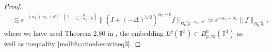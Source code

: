 \documentclass[12pt,a4paper]{article}
\theoremstyle{definition}
\theoremstyle{remark}
\numberwithin{equation}{section}
\begin{document}
\begin{appendices}
\begin{proof}
\begin{align*}
&\lesssim \epsilon^{-(\alpha_1+\alpha_3+\theta) \cdot \left( 1 - \frac{\theta}{\alpha_1+\alpha_3+\theta} \right)} \lVert (I + (- \Delta)^{1/2})^{\alpha_3 + \theta} f \rVert_{B^{-\alpha_1-\alpha_3-\theta}_{p,\infty}} \simeq \epsilon^{-\alpha_1 - \alpha_3} \lVert f \rVert_{B^{-\alpha_1}_{p,\infty}},
\end{align*}
where we have used Theorem 2.80 in \cite{bahouri}, the embedding $L^p (\mathbb{T}^3) \subset B^0_{p,\infty} (\mathbb{T}^3)$ as well as inequality \eqref{mollificationbesovineq3}.
\end{proof}
\end{appendices}
\footnotesize


\end{document}
